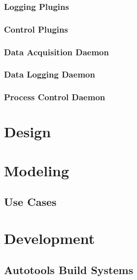 \documentclass[11pt]{article}
\begin{document}
      \subsubsection{Logging Plugins}\label{sec:req-srs-log-plug}

      \subsubsection{Control Plugins}\label{sec:req-srs-ctl-plug}

      \subsubsection{Data Acquisition Daemon}\label{sec:req-srs-daqd}

      \subsubsection{Data Logging Daemon}\label{sec:req-srs-logd}

      \subsubsection{Process Control Daemon}\label{sec:req-srs-ctld}

  \section{Design}\label{sec:dsg}

  \section{Modeling}\label{sec:mod}

    \subsection{Use Cases}\label{sec:mod-use}


  \section{Development}\label{sec:dev}

    \subsection{Autotools Build Systems}\label{sec:dev-ac}
\end{document}
